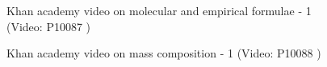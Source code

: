     \noindent
\label{m38712*eip-762}
    \setcounter{subfigure}{0}
	\begin{figure}[H] %
    \textnormal{Khan academy video on molecular and empirical formulae - 1}\vspace{.1in} \nopagebreak
  \label{m38712*yt-media1}\label{m38712*yt-video1}
             { (Video:  P10087 )}
      \vspace{2pt}
    \vspace{.1in}
 \end{figure}       \par \label{m38712*eip-306}
    \setcounter{subfigure}{0}
	\begin{figure}[H] %
    \textnormal{Khan academy video on mass composition - 1}\vspace{.1in} \nopagebreak
  \label{m38712*yt-media3}\label{m38712*yt-video3}
             { (Video:  P10088 )}
      \vspace{2pt}
    \vspace{.1in}
 \end{figure}       \par \label{m38712*secfhsst!!!underscore!!!id1437}

